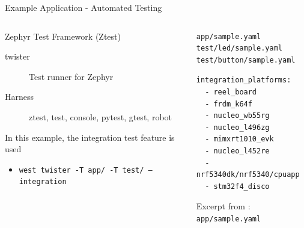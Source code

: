 \documentclass[10pt, aspectratio=169]{beamer}
\begin{document}
\begin{frame}[fragile]{Example Application - Automated Testing}
  \begin{columns}
    \begin{column}{0.6\textwidth}
      Zephyr Test Framework (Ztest)
      \begin{description}
        \item [twister] Test runner for Zephyr
        \item [Harness] ztest, test, console, pytest, gtest, robot
      \end{description}

      In this example, the integration test feature is used
      \begin{itemize}
          \item \scriptsize\texttt{west twister -T app/ -T test/ --integration}
      \end{itemize}
    \end{column}
    \begin{column}{0.4\textwidth}
        {\fontsize{7}{7}\selectfont
          \begin{verbatim}
app/sample.yaml
test/led/sample.yaml
test/button/sample.yaml
          \end{verbatim}
  \begin{listing}[H]
    \begin{verbatim}
integration_platforms:
  - reel_board
  - frdm_k64f
  - nucleo_wb55rg
  - nucleo_l496zg
  - mimxrt1010_evk
  - nucleo_l452re
  - nrf5340dk/nrf5340/cpuapp
  - stm32f4_disco
    \end{verbatim}
    \caption{\footnotesize{Excerpt from : \texttt{app/sample.yaml}}}
  \end{listing}
        }
    \end{column}
  \end{columns}
\end{frame}
\end{document}
